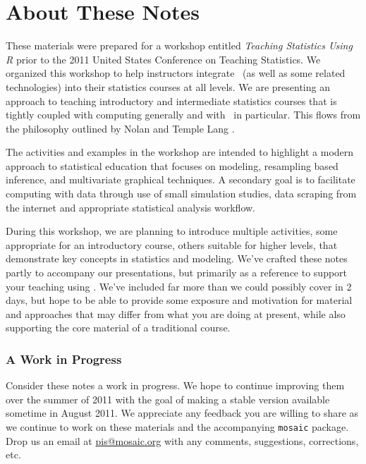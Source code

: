 
\chapter*{About These Notes}

These materials were prepared for a workshop entitled 
\emph{Teaching Statistics Using R} prior to the 2011 United States Conference 
on Teaching Statistics.  
We organized this workshop to help instructors integrate \R\ (as well as some 
related technologies) into their statistics courses at all levels.
We are presenting an approach to teaching introductory and intermediate
statistics courses that is tightly coupled with computing generally and with
\R\ in particular.  This flows from the
philosophy outlined by Nolan and Temple Lang \cite{nola:temp:2010}.

The activities and examples in the workshop are intended to highlight a modern
approach to statistical education that focuses on modeling, resampling based
inference, and multivariate graphical techniques.  A secondary goal is to
facilitate computing with data through use of small simulation studies, data
scraping from the internet and appropriate statistical analysis workflow.

During this workshop, we are planning to introduce multiple activities, some
appropriate for an introductory course, others suitable for higher levels, that
demonstrate key concepts in statistics and modeling.  We've crafted these notes
partly to accompany our presentations, but primarily as a reference to support
your teaching using \R.  We've included far more than we could possibly cover
in 2 days, but hope to be able to provide some exposure and motivation for
material and approaches that may differ from what you are doing at present,
while also supporting the core material of a traditional course.


\subsection*{A Work in Progress}
Consider these notes a work in progress.  We hope to continue
improving them over the summer of 2011 with the goal of making a stable version
available sometime in August 2011.
%
We appreciate any feedback you are willing to share as we continue
to work on these materials and the accompanying \verb!mosaic! package.  
Drop us an email at \url{pis@mosaic.org} with any comments, suggestions,
corrections, etc.

